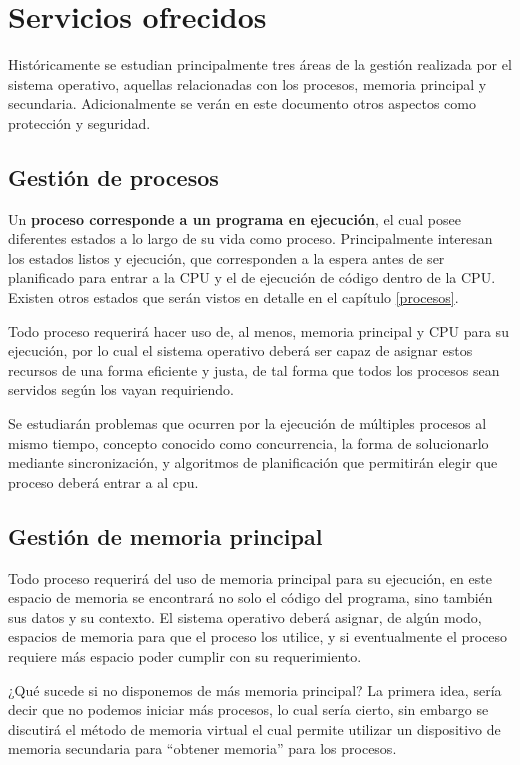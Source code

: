 \section{Servicios ofrecidos}
Históricamente se estudian principalmente tres áreas de la gestión realizada por
el sistema operativo, aquellas relacionadas con los procesos, memoria principal
y secundaria. Adicionalmente se verán en este documento otros aspectos como
protección y seguridad.

\subsection{Gestión de procesos}
Un \textbf{proceso corresponde a un programa en ejecución}, el cual posee
diferentes estados a lo largo de su vida como proceso. Principalmente interesan
los estados listos y ejecución, que corresponden a la espera antes de ser
planificado para entrar a la CPU y el de ejecución de código dentro de la CPU.
Existen otros estados que serán vistos en detalle en el capítulo
\ref{procesos}.

Todo proceso requerirá hacer uso de, al menos, memoria principal y CPU para su
ejecución, por lo cual el sistema operativo deberá ser capaz de asignar estos
recursos de una forma eficiente y justa, de tal forma que todos los procesos
sean servidos según los vayan requiriendo.

Se estudiarán problemas que ocurren por la ejecución de múltiples procesos al
mismo tiempo, concepto conocido como concurrencia, la forma de solucionarlo
mediante sincronización, y algoritmos de planificación que permitirán elegir que
proceso deberá entrar a al cpu.

\subsection{Gestión de memoria principal}
Todo proceso requerirá del uso de memoria principal para su ejecución, en este
espacio de memoria se encontrará no solo el código del programa, sino también
sus datos y su contexto. El sistema operativo deberá asignar, de algún modo,
espacios de memoria para que el proceso los utilice, y si eventualmente el
proceso requiere más espacio poder cumplir con su requerimiento.

¿Qué sucede si no disponemos de más memoria principal? La primera idea, sería
decir que no podemos iniciar más procesos, lo cual sería cierto, sin embargo se
discutirá el método de memoria virtual el cual permite utilizar un dispositivo
de memoria secundaria para ``obtener memoria'' para los procesos.

